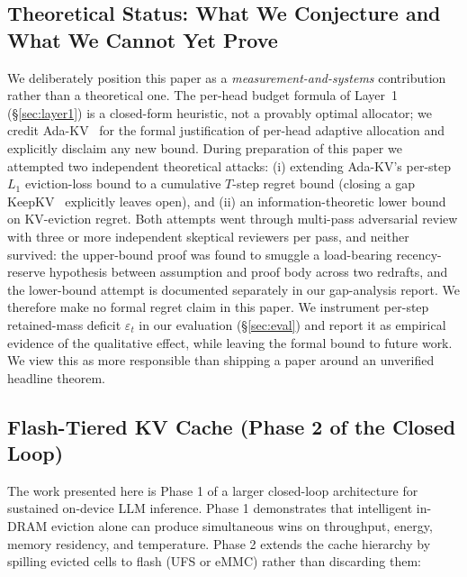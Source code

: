 \documentclass[sigconf, anonymous=false, screen=true]{acmart}
\begin{document}
\subsection{Theoretical Status: What We Conjecture and What We Cannot Yet Prove}
\label{sec:theory-gap}

We deliberately position this paper as a \emph{measurement-and-systems} contribution rather than a theoretical one. The per-head budget formula of Layer~1 (\S\ref{sec:layer1}) is a closed-form heuristic, not a provably optimal allocator; we credit Ada-KV~\cite{feng2025adakv} for the formal justification of per-head adaptive allocation and explicitly disclaim any new bound. During preparation of this paper we attempted two independent theoretical attacks: (i) extending Ada-KV's per-step $L_1$ eviction-loss bound to a cumulative $T$-step regret bound (closing a gap KeepKV~\cite{tian2026keepkv} explicitly leaves open), and (ii) an information-theoretic lower bound on KV-eviction regret. Both attempts went through multi-pass adversarial review with three or more independent skeptical reviewers per pass, and neither survived: the upper-bound proof was found to smuggle a load-bearing recency-reserve hypothesis between assumption and proof body across two redrafts, and the lower-bound attempt is documented separately in our gap-analysis report. We therefore make no formal regret claim in this paper. We instrument per-step retained-mass deficit $\varepsilon_t$ in our evaluation (\S\ref{sec:eval}) and report it as empirical evidence of the qualitative effect, while leaving the formal bound to future work. We view this as more responsible than shipping a paper around an unverified headline theorem.

\subsection{Flash-Tiered KV Cache (Phase 2 of the Closed Loop)}
\label{sec:future-flash-tier}

The work presented here is Phase 1 of a larger closed-loop architecture for sustained on-device LLM inference. Phase 1 demonstrates that intelligent in-DRAM eviction alone can produce simultaneous wins on throughput, energy, memory residency, and temperature. Phase 2 extends the cache hierarchy by spilling evicted cells to flash (UFS or eMMC) rather than discarding them:
\end{document}
